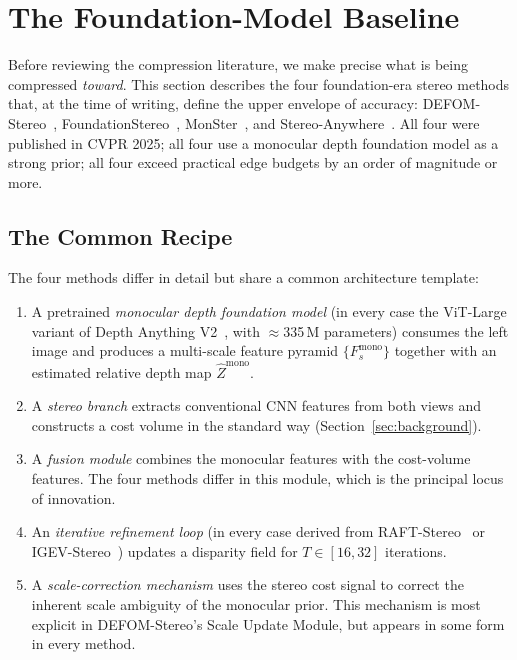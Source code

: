 \section{The Foundation-Model Baseline}
\label{sec:foundation}

Before reviewing the compression literature, we make precise what is being compressed \emph{toward}. This section describes the four foundation-era stereo methods that, at the time of writing, define the upper envelope of accuracy: DEFOM-Stereo~\cite{jiang2025defom}, FoundationStereo~\cite{wen2025foundationstereo}, MonSter~\cite{cheng2025monster}, and Stereo-Anywhere~\cite{bartolomei2025stereoanywhere}. All four were published in CVPR 2025; all four use a monocular depth foundation model as a strong prior; all four exceed practical edge budgets by an order of magnitude or more.

\subsection{The Common Recipe}

The four methods differ in detail but share a common architecture template:

\begin{enumerate}
\item A pretrained \emph{monocular depth foundation model} (in every case the ViT-Large variant of Depth Anything V2~\cite{yang2024dav2}, with $\approx$335\,M parameters) consumes the left image and produces a multi-scale feature pyramid $\{F^{\mathrm{mono}}_s\}$ together with an estimated relative depth map $\hat{Z}^{\mathrm{mono}}$.
\item A \emph{stereo branch} extracts conventional CNN features from both views and constructs a cost volume in the standard way (Section~\ref{sec:background}).
\item A \emph{fusion module} combines the monocular features with the cost-volume features. The four methods differ in this module, which is the principal locus of innovation.
\item An \emph{iterative refinement loop} (in every case derived from RAFT-Stereo~\cite{lipson2021raftstereo} or IGEV-Stereo~\cite{xu2023igev}) updates a disparity field for $T \in [16, 32]$ iterations.
\item A \emph{scale-correction mechanism} uses the stereo cost signal to correct the inherent scale ambiguity of the monocular prior. This mechanism is most explicit in DEFOM-Stereo's Scale Update Module, but appears in some form in every method.
\end{enumerate}

